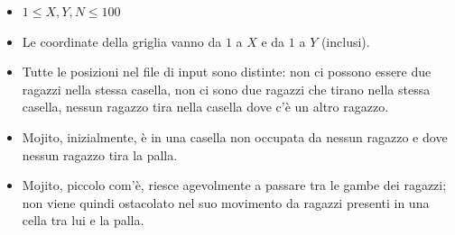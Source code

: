 \begin{itemize}[nolistsep, noitemsep]
  \item $1 \le X,Y,N \le 100$
  \item Le coordinate della griglia vanno da $1$ a $X$ e da $1$ a $Y$
    (inclusi).
  \item Tutte le posizioni nel file di input sono distinte: non ci
    possono essere due ragazzi nella stessa casella, non ci sono due
    ragazzi che tirano nella stessa casella, nessun ragazzo tira nella
    casella dove c’è un altro ragazzo.
  \item Mojito, inizialmente, è in una casella non occupata da nessun
    ragazzo e dove nessun ragazzo tira la palla.
  \item Mojito, piccolo com’è, riesce agevolmente a passare tra le
    gambe dei ragazzi; non viene quindi ostacolato nel suo movimento
    da ragazzi presenti in una cella tra lui e la palla.
\end{itemize}


